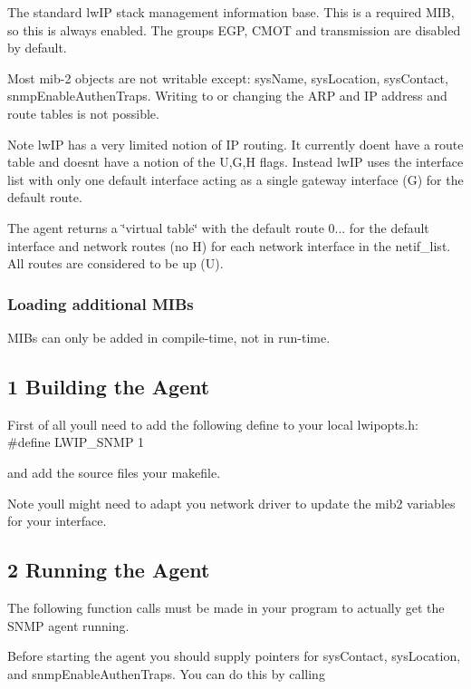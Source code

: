 The standard lw\+IP stack management information base. This is a required M\+IB, so this is always enabled. The groups E\+GP, C\+M\+OT and transmission are disabled by default.

Most mib-\/2 objects are not writable except\+: sys\+Name, sys\+Location, sys\+Contact, snmp\+Enable\+Authen\+Traps. Writing to or changing the A\+RP and IP address and route tables is not possible.

Note lw\+IP has a very limited notion of IP routing. It currently doen\textquotesingle{}t have a route table and doesn\textquotesingle{}t have a notion of the U,G,H flags. Instead lw\+IP uses the interface list with only one default interface acting as a single gateway interface (G) for the default route.

The agent returns a \char`\"{}virtual table\char`\"{} with the default route 0... for the default interface and network routes (no H) for each network interface in the netif\+\_\+list. All routes are considered to be up (U).

\subsubsection*{Loading additional M\+I\+Bs }

M\+I\+Bs can only be added in compile-\/time, not in run-\/time.

\subsection*{1 Building the Agent }

First of all you\textquotesingle{}ll need to add the following define to your local lwipopts.\+h\+: \#define L\+W\+I\+P\+\_\+\+S\+N\+MP 1

and add the source files your makefile.

Note you\textquotesingle{}ll might need to adapt you network driver to update the mib2 variables for your interface.

\subsection*{2 Running the Agent }

The following function calls must be made in your program to actually get the S\+N\+MP agent running.

Before starting the agent you should supply pointers for sys\+Contact, sys\+Location, and snmp\+Enable\+Authen\+Traps. You can do this by calling



